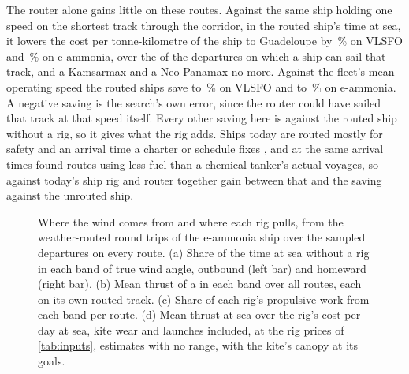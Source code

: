 The router alone gains little on these routes. Against the same ship holding one speed on the shortest track through the corridor, in the routed ship's time at sea, it lowers the cost per tonne-kilometre of the  ship to Guadeloupe by \NumRoutingAloneOil\,\% on VLSFO and \NumRoutingAloneAmmonia\,\% on e-ammonia, over the \NumRoutingDepartures{} of the \NumRoutingSampled{} departures on which a ship can sail that track, and a Kamsarmax and a Neo-Panamax no more. Against the fleet's mean operating speed the routed ships save \NumRoutingFleetOilLow{} to \NumRoutingFleetOilHigh\,\% on VLSFO and \NumRoutingFleetAmmoniaLow{} to \NumRoutingFleetAmmoniaHigh\,\% on e-ammonia. A negative saving is the search's own error, since the router could have sailed that track at that speed itself.  Every other saving here is against the routed ship without a rig, so it gives what the rig adds. Ships today are routed mostly for safety and an arrival time a charter or schedule fixes \citep{shao2012,cedelft2016,emsa2023}, and at the same arrival times \citet{wang2021} found routes using  less fuel than a chemical tanker's actual voyages, so against today's ship rig and router together gain between that and the saving against the unrouted ship.

\begin{figure}[tbp]
\centering
{}
\caption{Where the wind comes from and where each rig pulls, from the weather-routed round trips of the  e-ammonia ship over the sampled departures on every route. (a) Share of the time at sea without a rig in each band of true wind angle, outbound (left bar) and homeward (right bar). (b) Mean thrust of a  in each band over all routes, each on its own routed track. (c) Share of each rig's propulsive work from each band per route. (d) Mean thrust at sea over the rig's cost per day at sea, kite wear and launches included, at the rig prices of \cref{tab:inputs}, estimates with no range, with the kite's canopy at its goals.}
\label{fig:wind_angle}
\end{figure}

